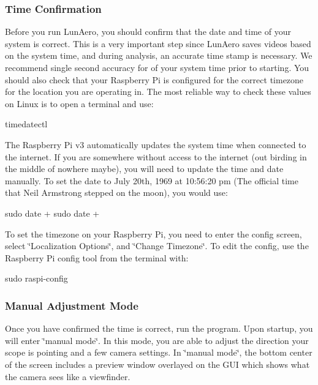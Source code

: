 \subsubsection*{Time Confirmation}

Before you run Lun\+Aero, you should confirm that the date and time of your system is correct. This is a very important step since Lun\+Aero saves videos based on the system time, and during analysis, an accurate time stamp is necessary. We recommend single second accuracy for of your system time prior to starting. You should also check that your Raspberry Pi is configured for the correct timezone for the location you are operating in. The most reliable way to check these values on Linux is to open a terminal and use\+:


\begin{DoxyCode}
timedatectl
\end{DoxyCode}


The Raspberry Pi v3 automatically updates the system time when connected to the internet. If you are somewhere without access to the internet (out birding in the middle of nowhere maybe), you will need to update the time and date manually. To set the date to July 20th, 1969 at 10\+:56\+:20 pm (The official time that Neil Armstrong stepped on the moon), you would use\+:


\begin{DoxyCode}
sudo date +%
sudo date +%
\end{DoxyCode}


To set the timezone on your Raspberry Pi, you need to enter the config screen, select \char`\"{}\+Localization Options\char`\"{}, and \char`\"{}\+Change Timezone\char`\"{}. To edit the config, use the Raspberry Pi config tool from the terminal with\+:


\begin{DoxyCode}
sudo raspi-config
\end{DoxyCode}


\subsubsection*{Manual Adjustment Mode}

Once you have confirmed the time is correct, run the program. Upon startup, you will enter \char`\"{}manual mode\char`\"{}. In this mode, you are able to adjust the direction your scope is pointing and a few camera settings. In \char`\"{}manual mode\char`\"{}, the bottom center of the screen includes a preview window overlayed on the G\+UI which shows what the camera sees like a viewfinder.

